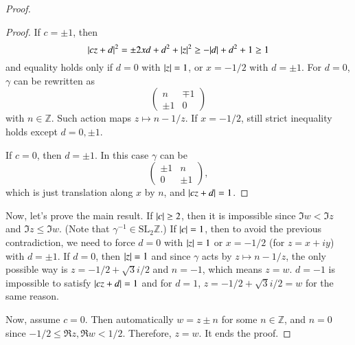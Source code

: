 \documentclass[a4paper, 12pt]{article}
\theoremstyle{Mydefinition}
\theoremstyle{Mytheorem}
\begin{document}
\begin{enumerate}
\begin{proof}
\begin{proof}
    If $c=\pm 1$, then 
    \begin{equation}
        \abs{cz+d}^2=\pm 2xd+d^2+\abs{z}^2\geq -\abs{d}+d^2+1\geq 1
    \end{equation}
    and equality holds only if $d=0$ with $\abs{z}=1$, or $x=-1/2$ with $d=\pm 1$. For $d=0$, $\gamma$ can be rewritten as
    \begin{equation}
        \begin{pmatrix}
            n & \mp 1\\
            \pm 1 & 0
        \end{pmatrix}
    \end{equation}
    with $n\in\mathbb{Z}$. Such action maps $z\mapsto n-1/z$. If $x=-1/2$, still strict inequality holds except $d=0,\pm 1$.
    
    If $c=0$, then $d=\pm 1$. In this case $\gamma$ can be
    \begin{equation}
        \begin{pmatrix}
            \pm 1 & n\\
            0 & \pm 1
        \end{pmatrix},
    \end{equation}
    which is just translation along $x$ by $n$, and $\abs{cz+d}=1$.
    \end{proof}
    
    Now, let's prove the main result. If $\abs{c}\geq 2$, then it is impossible since $\Im w< \Im z$ and $\Im z\leq \Im w$. (Note that $\gamma^{-1}\in\mathrm{SL}_2\mathbb{Z}$.) If $\abs{c}=1$, then to avoid the previous contradiction, we need to force $d=0$ with $\abs{z}=1$ or $x=-1/2$ (for $z=x+iy$) with $d=\pm 1$. If $d=0$, then $\abs{z}=1$ and since $\gamma$ acts by $z\mapsto n-1/z$, the only possible way is $z=-1/2+\sqrt{3}i/2$ and $n=-1$, which means $z=w$. $d=-1$ is impossible to satisfy $\abs{cz+d}=1$ and for $d=1$, $z=-1/2+\sqrt{3}i/2=w$ for the same reason.
    
    Now, assume $c=0$. Then automatically $w = z\pm n$ for some $n\in\mathbb{Z}$, and $n=0$ since $-1/2\leq\Re z,\Re w<1/2$. Therefore, $z=w$. It ends the proof.
    \end{proof}
    

\end{enumerate}
\end{document}
